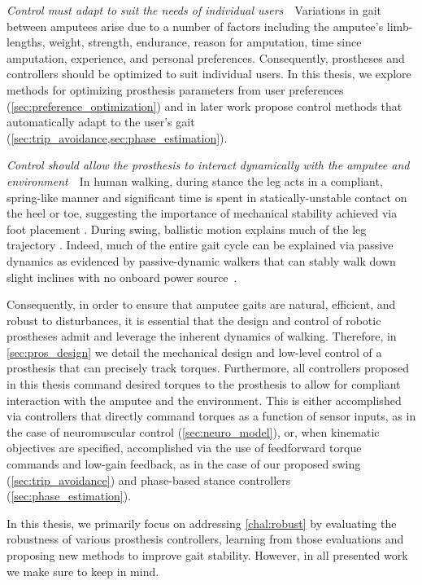 \begin{challenges}
    \item\label{chal:unique} \emph{Control must adapt to suit the needs of
    individual users}~~Variations in gait between amputees arise due to a number
    of factors including the amputee's limb-lengths, weight, strength,
    endurance, reason for amputation, time since amputation, experience, and
    personal preferences. Consequently, prostheses and controllers should be
    optimized to suit individual users. In this thesis, we explore methods for
    optimizing prosthesis parameters from user preferences
    (\cref{sec:preference_optimization}) and in later work propose control
    methods that automatically adapt to the user's gait
    (\cref{sec:trip_avoidance,sec:phase_estimation}).

    \item\label{chal:dynamic} \emph{Control should allow the prosthesis to
    interact dynamically with the amputee and environment}~~In human walking,
    during stance the leg acts in a compliant, spring-like manner
    \citep{geyer2006compliant} and significant time is spent in
    statically-unstable contact on the heel or toe, suggesting the importance of
    mechanical stability achieved via foot placement \citep{perry2010gait}.
    During swing, ballistic motion explains much of the leg trajectory
    \citep{mochon1980ballistic}. Indeed, much of the entire gait cycle can be
    explained via passive dynamics as evidenced by passive-dynamic walkers that
    can stably walk down slight inclines with no onboard power
    source~\citep{mcgeer1990passive, collins2005efficient}.

    Consequently, in order to ensure that amputee gaits are natural, efficient,
    and robust to disturbances, it is essential that the design and control of
    robotic prostheses admit and leverage the inherent dynamics of walking.
    Therefore, in \cref{sec:pros_design} we detail the mechanical design and
    low-level control of a prosthesis that can precisely track torques.
    Furthermore, all controllers proposed in this thesis command desired torques
    to the prosthesis to allow for compliant interaction with the amputee and
    the environment. This is either accomplished via controllers that directly
    command torques as a function of sensor inputs, as in the case of
    neuromuscular control (\cref{sec:neuro_model}), or, when kinematic
    objectives are specified, accomplished via the use of feedforward torque
    commands and low-gain feedback, as in the case of our proposed swing
    (\cref{sec:trip_avoidance}) and phase-based stance controllers
    (\cref{sec:phase_estimation}).
\end{challenges}

In this thesis, we primarily focus on addressing \cref{chal:robust} by
evaluating the robustness of various prosthesis controllers, learning from those
evaluations and proposing new methods to improve gait stability. However, in all
presented work we make sure to keep  in
mind.
